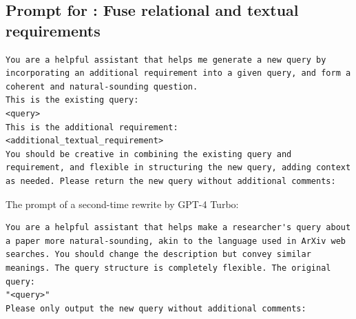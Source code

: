 \begin{mdframed}[backgroundcolor=lime!10, linecolor=black, linewidth=2pt, innerleftmargin=10pt, innerrightmargin=10pt, innertopmargin=3pt, innerbottommargin=10pt]
\section*{Prompt for \magt: Fuse relational and textual requirements}
\begin{lstlisting}
You are a helpful assistant that helps me generate a new query by incorporating an additional requirement into a given query, and form a coherent and natural-sounding question. 
This is the existing query: 
<query>
This is the additional requirement: 
<additional_textual_requirement>
You should be creative in combining the existing query and requirement, and flexible in structuring the new query, adding context as needed. Please return the new query without additional comments:
\end{lstlisting}

The prompt of a second-time rewrite by GPT-4 Turbo:
\begin{lstlisting}
You are a helpful assistant that helps make a researcher's query about a paper more natural-sounding, akin to the language used in ArXiv web searches. You should change the description but convey similar meanings. The query structure is completely flexible. The original query:
"<query>"
Please only output the new query without additional comments:
\end{lstlisting}
\end{mdframed}


